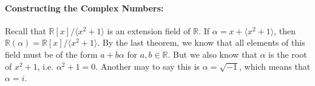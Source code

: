 \documentclass[10pt,a4paper]{article}
\begin{document}
\paragraph{Constructing the Complex Numbers:} Recall that $\mathbb{R}[x]/\langle x^2 +1 \rangle $ is an extension field of $\mathbb{R}$. If $\alpha = x + \langle x^2 +1 \rangle$, then $\mathbb{R}(\alpha) = \mathbb{R}[x]/ \langle x^2 +1 \rangle$. By the last theorem, we know that all elements of this field must be of the form $a+b\alpha$ for $a,b \in \mathbb{R}$. But we also know that $\alpha$ is the root of $x^2+1$, i.e. $\alpha^2 + 1 = 0$. Another may to say this is $\alpha = \sqrt{-1}$, which means that $\alpha = i$.
\end{document}

